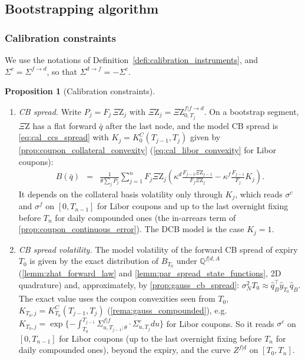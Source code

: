 \documentclass[11pt,english]{amsart}
\newcommand{\QQ}{\mathbb{Q}}
\newcommand{\QZ}{{\Xi\mathrm{Z}}}
\theoremstyle{definition}
\newtheorem{prop}{Proposition}
\begin{document}
\subsection{Bootstrapping algorithm}%

\subsubsection{Calibration constraints}%

We use the notations of Definition~\ref{defi:calibration_instruments}, and $\Sigma^c = \Sigma^{f\to d}$, so that $\Sigma^{d\to f} = -\Sigma^c$.

\begin{prop}[Calibration constraints]\label{prop:cal_constraints}
\begin{enumerate}
\item \emph{CB spread.} Write $P_j = F_j\,\QZ_j$ with $\QZ_j = \QZ^{f|f\to d}_{0,T_j}$. On a bootstrap segment, $\QZ$ has a flat forward $\bar{q}$ after the last node, and the model CB spread is \eqref{eq:cal_ccs_spread} with $K_j = K^C_0(T_{j-1},T_j)$ given by \autoref{prop:coupon_collateral_convexity} (\eqref{eq:cal_libor_convexity} for Libor coupons):
\begin{eqnarray}
  B(\bar{q}) &=& \frac{1}{\theta\sum_{j}P_j}\sum_{j=1}^n F_j\QZ_j \left( \kappa^d \frac{F_{j-1}\QZ_{j-1}}{F_j\QZ_j} - \kappa^f \frac{F_{j-1}}{F_j} K_j \right) .
\end{eqnarray}
It depends on the collateral basis volatility only through $K_j$, which reads $\sigma^c$ and $\sigma^f$ on $[0,T_{n-1}]$ for Libor coupons and up to the last overnight fixing before $T_n$ for daily compounded ones (the in-arrears term of \autoref{prop:coupon_continuous_error}). The DCB model is the case $K_j = 1$.
\item \emph{CB spread volatility.} The model volatility of the forward CB spread of expiry $T_0$ is given by the exact distribution of $B_{T_0}$ under $\QQ^{f|d,A}$ (\autoref{lemm:zhat_forward_law} and \autoref{lemm:par_spread_state_functions}, 2D quadrature) and, approximately, by \autoref{prop:gauss_cb_spread}: $\sigma_N^2T_0\approx\hat{q}_B^\top\hat{y}_{T_0}\hat{q}_B$. The exact value uses the coupon convexities seen from $T_0$, $K_{T_0,j} = K^C_{T_0}(T_{j-1},T_j)$ (\autoref{rema:gauss_compounded}), e.g.\ $K_{T_0,j} = \exp\{-\int_{T_0}^{T_{j-1}}\Sigma^{f|f}_{u,T_{j-1};\theta}\cdot\Sigma^{c}_{u,T_j}du\}$ for Libor coupons. So it reads $\sigma^c$ on $[0,T_{n-1}]$ for Libor coupons (up to the last overnight fixing before $T_n$ for daily compounded ones), beyond the expiry, and the curve $Z^{f|d}$ on $[T_0,T_n]$.

\end{enumerate}
\end{prop}
\end{document}
